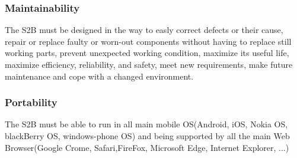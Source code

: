 	\subsubsection{Maintainability}
	The S2B must be designed in the way to easly correct defects or their cause,
	repair or replace faulty or worn-out components without having to replace still working parts,
	prevent unexpected working condition,
	maximize its useful life,
	maximize efficiency, reliability, and safety,
	meet new requirements,
	make future maintenance and
	cope with a changed environment.
	
	\subsubsection{Portability}
	The S2B must be able to run in all main mobile OS(Android, iOS, Nokia OS, blackBerry OS, windows-phone OS) and being supported by all the main Web Browser(Google Crome, Safari,FireFox, Microsoft Edge, Internet Explorer, ...)\newline
	
